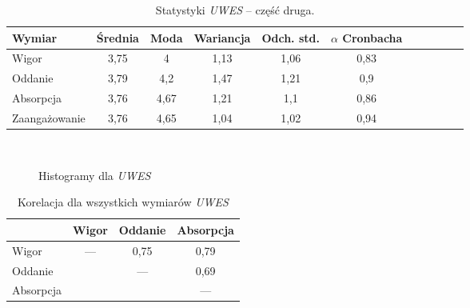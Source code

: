 \begin{table}[h!]
\begin{center}
\begin{tabular}{l | c c c c c c c c c c}
Wymiar & Średnia & Moda & Wariancja & Odch. std. & $\alpha$ Cronbacha\\ \hline \hline
Wigor & 3,75 & 4 & 1,13 & 1,06 & 0,83 \\
Oddanie & 3,79 & 4,2 & 1,47 & 1,21 & 0,9 \\
Absorpcja & 3,76 & 4,67 & 1,21 & 1,1 & 0,86 \\ \hline
Zaangażowanie & 3,76 & 4,65 & 1,04 & 1,02 & 0,94 \\
\end{tabular}
\end{center}
\caption{Statystyki \emph{UWES} -- część druga.}
\label{tab:uwes-stats-2}
\end{table}

\begin{figure}[h]
    \centering
    \\
    \caption{Histogramy dla \emph{UWES}}
\end{figure}

\begin{table}[h!]
\begin{center}
\begin{tabular}{l | c c c }
 & Wigor & Oddanie & Absorpcja \\ \hline \hline
Wigor & --- & 0,75 & 0,79 \\
Oddanie & & --- & 0,69 \\
Absorpcja & & & --- \\
\end{tabular}
\end{center}
\caption{Korelacja dla wszystkich wymiarów \emph{UWES}}
\label{tab:uwes-correl}
\end{table}

